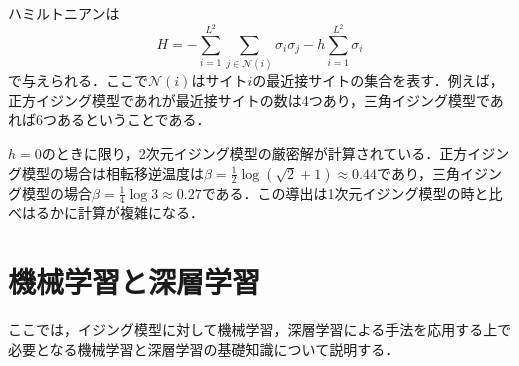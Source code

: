 \documentclass[a4paper,11pt]{jsreport}
\begin{document}
ハミルトニアンは
\begin{equation}
  H = - \sum_{i=1}^{L^2} \sum_{j \in \mathcal{N}(i)} \sigma_i \sigma_j
  - h \sum_{i=1}^{L^2} \sigma_i
\end{equation}
で与えられる．ここで$\mathcal{N}(i)$はサイト$i$の最近接サイトの集合を表す．例えば，正方イジング模型であれが最近接サイトの数は4つあり，三角イジング模型であれば6つあるということである．\par
$h=0$のときに限り，2次元イジング模型の厳密解が計算されている．正方イジング模型の場合は相転移逆温度は$\beta = \frac{1}{2}\log{(\sqrt{2}+1)} \approx 0.44$であり，三角イジング模型の場合$\beta = \frac{1}{4}\log{3} \approx 0.27$である．この導出は1次元イジング模型の時と比べはるかに計算が複雑になる．



\chapter{機械学習と深層学習}
ここでは，イジング模型に対して機械学習，深層学習による手法を応用する上で必要となる機械学習と深層学習の基礎知識について説明する．\cite{瀧2017これなら}\cite{富谷2021これなら}\cite{田中2019ディープ}\cite{福嶋2022基礎からの}
\end{document}
